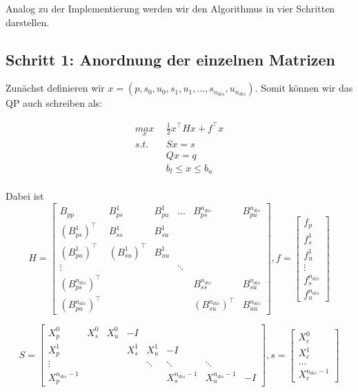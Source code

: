 Analog zu der Implementierung werden wir den Algorithmus in vier Schritten darstellen.

\subsection*{Schritt 1: Anordnung der einzelnen Matrizen}

Zunächst definieren wir $x=(p,s_0,u_0,s_1,u_1,\hdots,s_{n_{dis}},u_{n_{dis}})$. Somit können wir das QP auch schreiben als:

\begin{align*}
\underset{x}{max} \ \ 	& \frac{1}{2}	x^\top H x+f^\top x \\
s.t. \ \ 				& Sx=s \\
						& Qx=q \\
						& b_l \leq x \leq b_u \\ 
\end{align*}

Dabei ist $$H= \left[ \begin{array}{cccccc}
B_{pp} & B_{ps}^1 & B_{pu}^1 & \hdots & B_{ps}^{n_{dis}} & B_{pu}^{n_{dis}} \\ 
(B_{ps}^1)^\top & B_{ss}^1 & B_{su}^1 &  &  & \\ 
(B_{pu}^1)^\top & (B_{su}^1)^\top & B_{uu}^1 &  &  &  \\ 
\vdots &  &  & \ddots &  &  \\ 
(B_{ps}^{n_{dis}})^\top &  &  &  & B_{ss}^{n_{dis}} & B_{su}^{n_{dis}} \\ 
(B_{pu}^{n_{dis}})^\top &  &  &  & (B_{su}^{n_{dis}})^\top & B_{uu}^{n_{dis}}
\end{array} \right]  
,f=\left[ \begin{array}{c}
f_p \\ 
f_s^1 \\ 
f_u^1 \\ 
\vdots \\ 
f_s^{n_{dis}} \\ 
f_u^{n_{dis}}
\end{array}  \right]$$

$$S=\left[\begin{array}{cccccccc}
X_p^0 & X_s^0 & X_u^0 & - I &  &  &  &  \\ 
X_p^1 &  &  & X_s^1 & X_u ^1  & -I &  &  \\ 
\vdots &  &  &  & \ddots & \ddots & \ddots &  \\ 
X_p^{n_{dis}-1} &  &  &  &  & X_s^{n_{dis}-1} & X_u^{n_{dis}-1} & -I
\end{array}  \right],
s=\left[ \begin{array}{c}
X_c^ 0 \\ 
X_c^1 \\ 
\hdots \\ 
X_c^{n_{dis}-1}
\end{array} \right] $$

